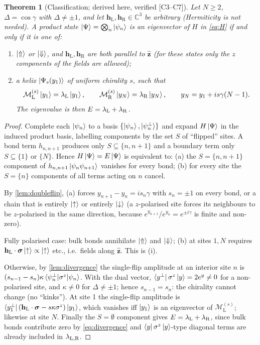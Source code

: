 \documentclass[11pt,a4paper]{article}
\newtheorem{theorem}{Theorem}[section]
\theoremstyle{definition}
\newcommand{\hL}{\mathbf h_{\mathrm L}}
\newcommand{\hR}{\mathbf h_{\mathrm R}}
\newcommand{\bsig}{\boldsymbol\sigma}
\newcommand{\ML}[1][s]{\mathcal M_{\mathrm L}^{(#1)}}
\newcommand{\MR}[1][s]{\mathcal M_{\mathrm R}^{(#1)}}
\newcommand{\ez}{\hat{\mathbf z}}
\newcommand{\ver}[1]{\textsf{[#1]}}   %
\begin{document}
\begin{theorem}[Classification; derived here, verified \ver{C3--C7}]\label{thm:classification}
Let $N\ge2$, $\Delta=\cos\gamma$ with $\Delta\neq\pm1$, and let $\hL,\hR\in\mathbb C^3$ be arbitrary (Hermiticity is not needed). A product state $\ket\Psi=\bigotimes_n\ket{\psi_n}$ is an eigenvector of $H$ in \eqref{eq:H} if and only if it is one of:
\begin{enumerate}[label=(\roman*)]
\item $\ket{\Uparrow}$ or $\ket{\Downarrow}$, and $\hL,\hR$ are both parallel to $\ez$ (for these states only the $z$ components of the fields are allowed);
\item a helix $\ket{\Psi_s(y_1)}$ of \emph{uniform} chirality $s$, such that
\begin{equation}\label{eq:bc}
\ML\ket{y_1}=\lambda_{\rm L}\ket{y_1},\qquad \MR\ket{y_N}=\lambda_{\rm R}\ket{y_N},\qquad y_N=y_1+is\gamma(N-1).
\end{equation}
The eigenvalue is then $E=\lambda_{\rm L}+\lambda_{\rm R}$.
\end{enumerate}
\end{theorem}
\begin{proof}
Complete each $\ket{\psi_n}$ to a basis $\{\ket{\psi_n},\ket{\psi_n^\perp}\}$ and expand $H\ket\Psi$ in the induced product basis, labelling components by the set $S$ of ``flipped'' sites. A bond term $h_{n,n+1}$ produces only $S\subseteq\{n,n+1\}$ and a boundary term only $S\subseteq\{1\}$ or $\{N\}$. Hence $H\ket\Psi=E\ket\Psi$ is equivalent to: (a) the $S=\{n,n+1\}$ component of $h_{n,n+1}\ket{\psi_n\psi_{n+1}}$ vanishes for every bond; (b) for every site the $S=\{n\}$ components of all terms acting on $n$ cancel.

By \cref{lem:doubleflip}, (a) forces $y_{n+1}-y_n=is_n\gamma$ with $s_n=\pm1$ on every bond, or a chain that is entirely $\ket\uparrow$ or entirely $\ket\downarrow$ (a $z$-polarised site forces its neighbours to be $z$-polarised in the same direction, because $e^{y_{n+1}}/e^{y_n}=e^{\pm i\gamma}$ is finite and non-zero).

Fully polarised case: bulk bonds annihilate $\ket\Uparrow$ and $\ket\Downarrow$; (b) at sites $1,N$ requires $\hL\cdot\bsig\ket\uparrow\propto\ket\uparrow$ etc., i.e.\ fields along $\ez$. This is (i).

Otherwise, by \cref{lem:divergence} the single-flip amplitude at an interior site $n$ is $(s_{n-1}-s_n)\kappa\braket{\psi_n^\perp|\sigma^z|\psi_n}$. With the dual vector, $\bra{y^\perp}\sigma^z\ket y=2e^{y}\neq0$ for a non-polarised site, and $\kappa\neq0$ for $\Delta\neq\pm1$; hence $s_{n-1}=s_n$: the chirality cannot change (no ``kinks''). At site 1 the single-flip amplitude is $\bra{y_1^\perp}(\hL\cdot\bsig-s\kappa\sigma^z)\ket{y_1}$, which vanishes iff $\ket{y_1}$ is an eigenvector of $\ML$; likewise at site $N$. Finally the $S=\emptyset$ component gives $E=\lambda_{\rm L}+\lambda_{\rm R}$, since bulk bonds contribute zero by \eqref{eq:divergence} and $\bra{y}\sigma^z\ket y$-type diagonal terms are already included in $\lambda_{\rm L,R}$.
\end{proof}
\end{document}
